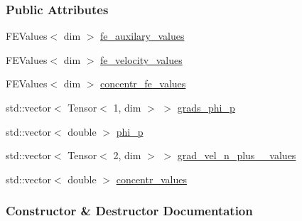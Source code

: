 \subsubsection*{Public Attributes}
\begin{DoxyCompactItemize}
\item 
F\+E\+Values$<$ dim $>$ \hyperlink{struct_assembly_1_1_scratch_1_1relaxation__div__velocity__step_a3ee5d28e551b9672965d42c6a6f7e8ac}{fe\+\_\+auxilary\+\_\+values}
\item 
F\+E\+Values$<$ dim $>$ \hyperlink{struct_assembly_1_1_scratch_1_1relaxation__div__velocity__step_aff257091b62794122cf0a9f5ac2faafe}{fe\+\_\+velocity\+\_\+values}
\item 
F\+E\+Values$<$ dim $>$ \hyperlink{struct_assembly_1_1_scratch_1_1relaxation__div__velocity__step_a8c8792bcf1173a82f73e22ef1ef0dc02}{concentr\+\_\+fe\+\_\+values}
\item 
std\+::vector$<$ Tensor$<$ 1, dim $>$ $>$ \hyperlink{struct_assembly_1_1_scratch_1_1relaxation__div__velocity__step_a9fae0fc0a91b6c248c1f19bc7907a8cd}{grads\+\_\+phi\+\_\+p}
\item 
std\+::vector$<$ double $>$ \hyperlink{struct_assembly_1_1_scratch_1_1relaxation__div__velocity__step_a62319566acffdbef4ff0b505bae37b01}{phi\+\_\+p}
\item 
std\+::vector$<$ Tensor$<$ 2, dim $>$ $>$ \hyperlink{struct_assembly_1_1_scratch_1_1relaxation__div__velocity__step_a8eb65ba7135f100ceadb24a86d5d32ae}{grad\+\_\+vel\+\_\+n\+\_\+plus\+\_\+\_\+values}
\item 
std\+::vector$<$ double $>$ \hyperlink{struct_assembly_1_1_scratch_1_1relaxation__div__velocity__step_ae1f4407f45f1f05b5d69062f74f95425}{concentr\+\_\+values}
\end{DoxyCompactItemize}


\subsubsection{Constructor \& Destructor Documentation}
\hypertarget{struct_assembly_1_1_scratch_1_1relaxation__div__velocity__step_ac3a5853ca83d9a9c1b5f9a14792369eb}{}
